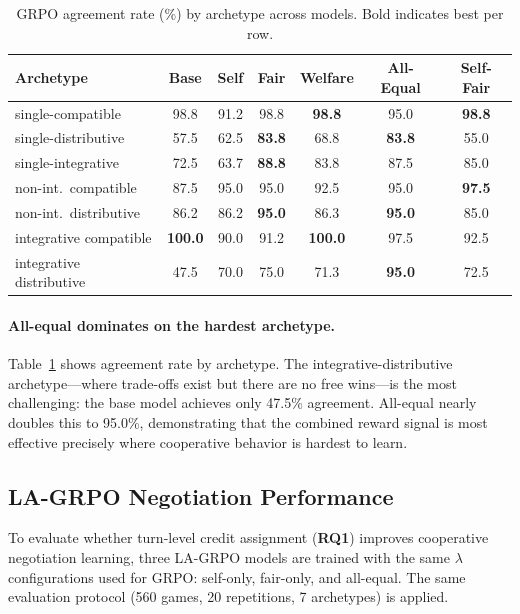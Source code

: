 \documentclass[12pt,a4paper]{article}
\renewcommand{\arraystretch}{1.25}
\begin{document}
\begin{table}[H]
\centering
\caption[GRPO agreement rate (\%) by archetype across models.]{GRPO agreement rate (\%) by archetype across models. Bold indicates best per row.}
\label{tab:arch_agreement}
\renewcommand{\arraystretch}{1.15}
\begin{tabular}{lcccccc}
\toprule
\textbf{Archetype} & \textbf{Base} & \textbf{Self} & \textbf{Fair} & \textbf{Welfare} & \textbf{All-Equal} & \textbf{Self-Fair} \\
\midrule
single-compatible & 98.8 & 91.2 & 98.8 & \textbf{98.8} & 95.0 & \textbf{98.8} \\
single-distributive & 57.5 & 62.5 & \textbf{83.8} & 68.8 & \textbf{83.8} & 55.0 \\
single-integrative & 72.5 & 63.7 & \textbf{88.8} & 83.8 & 87.5 & 85.0 \\
non-int.\ compatible & 87.5 & 95.0 & 95.0 & 92.5 & 95.0 & \textbf{97.5} \\
non-int.\ distributive & 86.2 & 86.2 & \textbf{95.0} & 86.3 & \textbf{95.0} & 85.0 \\
integrative compatible & \textbf{100.0} & 90.0 & 91.2 & \textbf{100.0} & 97.5 & 92.5 \\
integrative distributive & 47.5 & 70.0 & 75.0 & 71.3 & \textbf{95.0} & 72.5 \\
\bottomrule
\end{tabular}
\end{table}

\paragraph{All-equal dominates on the hardest archetype.} Table~\ref{tab:arch_agreement} shows agreement rate by archetype. The integrative-distributive archetype---where trade-offs exist but there are no free wins---is the most challenging: the base model achieves only 47.5\% agreement. All-equal nearly doubles this to 95.0\%, demonstrating that the combined reward signal is most effective precisely where cooperative behavior is hardest to learn.


\subsection{LA-GRPO Negotiation Performance}

To evaluate whether turn-level credit assignment (\textbf{RQ1}) improves cooperative negotiation learning, three LA-GRPO models are trained with the same $\lambda$ configurations used for GRPO: self-only, fair-only, and all-equal. The same evaluation protocol (560 games, 20 repetitions, 7 archetypes) is applied.
\end{document}

